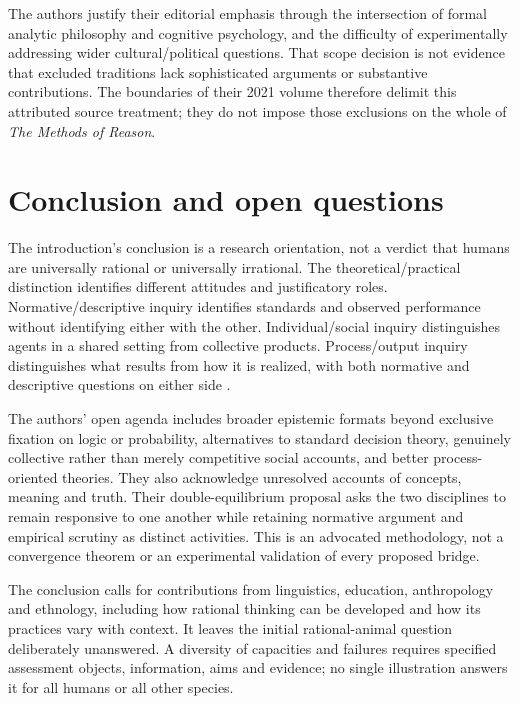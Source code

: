 The authors justify their editorial emphasis through the intersection
of formal analytic philosophy and cognitive psychology, and the
difficulty of experimentally addressing wider cultural/political
questions. That scope decision is not evidence that excluded traditions
lack sophisticated arguments or substantive contributions. The
boundaries of their 2021 volume therefore delimit this attributed
source treatment; they do not impose those exclusions on the whole
of \emph{The Methods of Reason}.

\section{Conclusion and open questions}
\label{sec:p11-ri-conclusion}

The introduction's conclusion is a research orientation, not a verdict
that humans are universally rational or universally irrational.
The theoretical/practical distinction identifies different attitudes
and justificatory roles. Normative/descriptive inquiry identifies
standards and observed performance without identifying either with
the other. Individual/social inquiry distinguishes agents in a shared
setting from collective products. Process/output inquiry distinguishes
what results from how it is realized, with both normative and
descriptive questions on either side
\cite[pp.~50--51]{KnauffSpohn2021FrameworksIntro}.

The authors' open agenda includes broader epistemic formats beyond
exclusive fixation on logic or probability, alternatives to standard
decision theory, genuinely collective rather than merely competitive
social accounts, and better process-oriented theories. They also
acknowledge unresolved accounts of concepts, meaning and truth.
Their double-equilibrium proposal asks the two disciplines to remain
responsive to one another while retaining normative argument and
empirical scrutiny as distinct activities. This is an advocated
methodology, not a convergence theorem or an experimental validation
of every proposed bridge.

The conclusion calls for contributions from linguistics, education,
anthropology and ethnology, including how rational thinking can be
developed and how its practices vary with context. It leaves the
initial rational-animal question deliberately unanswered. A diversity
of capacities and failures requires specified assessment objects,
information, aims and evidence; no single illustration answers it
for all humans or all other species.

